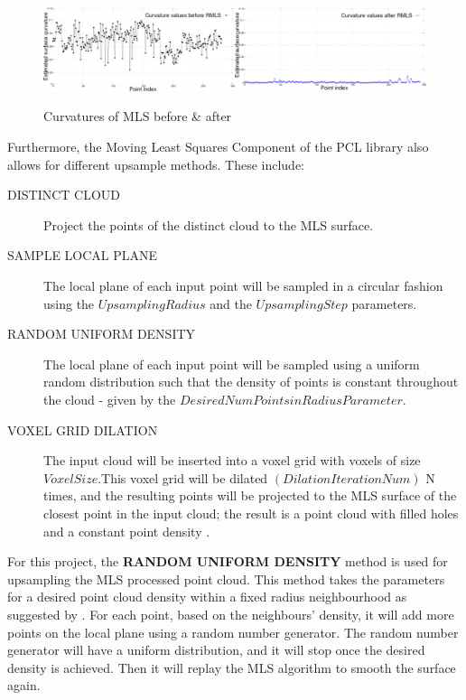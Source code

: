 \documentclass[12pt]{report}
\begin{document}
\begin{figure}[H]%
  \centering
  \includegraphics[width=1\textwidth]{resampling_2.jpg}
 \caption{Curvatures of MLS before \& after}\cite[]{Rusu_ICRA2011_PCL}
 \label{fig:smoothing_curvature} 
\end{figure}

Furthermore, the Moving Least Squares Component of the PCL library also allows for different upsample methods. 
These include:
\begin{description}
  \item[DISTINCT CLOUD] Project the points of the distinct cloud to the MLS surface\cite[]{Rusu_ICRA2011_PCL}.
  \item[SAMPLE LOCAL PLANE] The local plane of each input point will be sampled in a circular fashion using the $UpsamplingRadius$  and the $UpsamplingStep$ parameters\cite[]{Rusu_ICRA2011_PCL}. 
  \item[RANDOM UNIFORM DENSITY] The local plane of each input point will be sampled using a uniform random distribution such that the density of points is constant throughout the cloud - given by the $Desired Num Points in Radius Parameter$\cite[]{Rusu_ICRA2011_PCL}. 
  \item[VOXEL GRID DILATION] The input cloud will be inserted into a voxel grid with voxels of size $Voxel Size$.This voxel grid will be dilated $(Dilation Iteration Num)$ N times, and the resulting points will be projected to the MLS surface of the closest point in the input cloud; the result is a point cloud with filled holes and a constant point density \cite[]{Rusu_ICRA2011_PCL}.
\end{description}

For this project,  the \textbf {RANDOM UNIFORM DENSITY} method is used for upsampling the MLS processed point cloud. 
This method takes the parameters for a desired point cloud density within a fixed radius neighbourhood as suggested by . 
For each point, based on the neighbours' density, it will add more points on the local plane using a random number generator.
The random number generator will have a uniform distribution, and it will stop once the desired density is achieved. Then it will replay the MLS algorithm to smooth the surface again.
\end{document}

